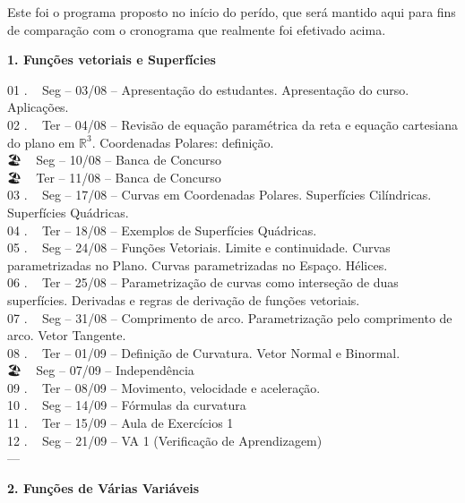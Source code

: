 \documentclass[
  letterpaper,
  DIV=11,
  numbers=noendperiod]{scrartcl}
\begin{document}
Este foi o programa proposto no início do perído, que será mantido aqui
para fins de comparação com o cronograma que realmente foi efetivado
acima.

{ \textbf{1. Funções vetoriais e Superfícies} }

01 . ~ Seg -- 03/08 -- { Apresentação do estudantes. Apresentação do
curso. Aplicações. }\\
02 . ~ Ter -- 04/08 -- { Revisão de equação paramétrica da reta e
equação cartesiana do plano em \(\mathbb{R}^3\). Coordenadas Polares:
definição. }\\
{🏖️} { ~ Seg -- 10/08 -- Banca de Concurso }\\
{🏖️} { ~ Ter -- 11/08 -- Banca de Concurso }\\
03 . ~ Seg -- 17/08 -- { Curvas em Coordenadas Polares. Superfícies
Cilíndricas. Superfícies Quádricas. }\\
04 . ~ Ter -- 18/08 -- { Exemplos de Superfícies Quádricas. }\\
05 . ~ Seg -- 24/08 -- { Funções Vetoriais. Limite e continuidade.
Curvas parametrizadas no Plano. Curvas parametrizadas no Espaço.
Hélices. }\\
06 . ~ Ter -- 25/08 -- { Parametrização de curvas como interseção de
duas superfícies. Derivadas e regras de derivação de funções vetoriais.
}\\
07 . ~ Seg -- 31/08 -- { Comprimento de arco. Parametrização pelo
comprimento de arco. Vetor Tangente. }\\
08 . ~ Ter -- 01/09 -- { Definição de Curvatura. Vetor Normal e
Binormal. }\\
{🏖️} { ~ Seg -- 07/09 -- Independência }\\
09 . ~ Ter -- 08/09 -- { Movimento, velocidade e aceleração. }\\
10 . ~ Seg -- 14/09 -- { Fórmulas da curvatura }\\
11 . ~ Ter -- 15/09 -- { Aula de Exercícios 1 }\\
{ 12 . ~ Seg -- 21/09 -- VA 1 (Verificação de Aprendizagem) }\\
---

{ \textbf{2. Funções de Várias Variáveis} }
\end{document}
